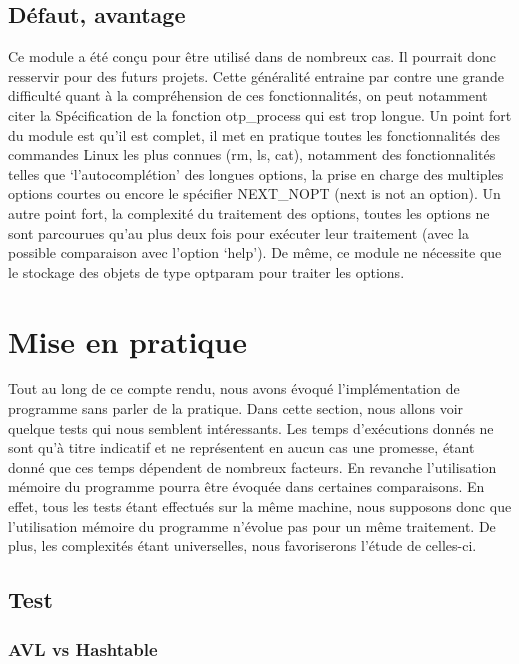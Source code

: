 \documentclass[12pt]{article}
\begin{document}
    \subsection{Défaut, avantage}

    Ce module a été conçu pour être utilisé dans de nombreux cas. Il pourrait 
    donc resservir pour des futurs projets. Cette généralité entraine par contre 
    une grande difficulté quant à la compréhension de ces fonctionnalités, on 
    peut notamment citer la Spécification de la fonction otp\_process qui est 
    trop longue.
    Un point fort du module est qu'il est complet, il met en pratique toutes les 
    fonctionnalités des commandes Linux les plus connues (rm, ls, cat), 
    notamment des fonctionnalités telles que `l'autocomplétion' des longues 
    options, la prise en charge des multiples options courtes ou encore le 
    spécifier NEXT\_NOPT (next is not an option). Un autre point fort, la 
    complexité du traitement des options, toutes les options ne sont parcourues 
    qu'au plus deux fois pour exécuter leur traitement (avec la possible 
    comparaison avec l'option `help'). De même, ce module ne nécessite que le 
    stockage des objets de type optparam pour traiter les options.

    \section{Mise en pratique}\label{test}

    Tout au long de ce compte rendu, nous avons évoqué l'implémentation de 
    programme sans parler de la pratique. Dans cette section, nous allons voir
    quelque tests qui nous semblent intéressants.
    Les temps d'exécutions donnés ne sont qu'à titre indicatif et ne 
    représentent en aucun cas une promesse, étant donné que ces temps dépendent 
    de nombreux facteurs. En revanche l'utilisation mémoire du programme pourra 
    être évoquée dans certaines comparaisons. En effet, tous les tests étant 
    effectués sur la même machine, nous supposons donc que l'utilisation mémoire 
    du programme n'évolue pas pour un même traitement. De plus, les complexités 
    étant universelles, nous favoriserons l'étude de celles-ci.

    \subsection{Test}

    \subsubsection{AVL vs Hashtable}\label{avl-has}
\end{document}
